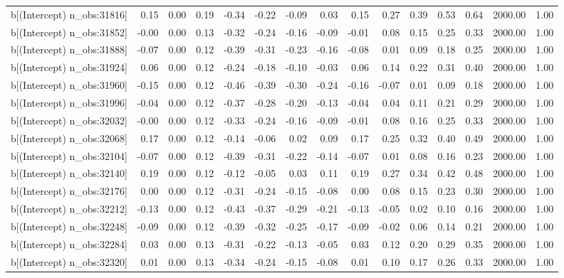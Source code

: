 \begin{table}[ht]
\begin{tabular}{rrrrrrrrrrrrrrr}
  b[(Intercept) n\_obs:31816] & 0.15 & 0.00 & 0.19 & -0.34 & -0.22 & -0.09 & 0.03 & 0.15 & 0.27 & 0.39 & 0.53 & 0.64 & 2000.00 & 1.00 \\ 
  b[(Intercept) n\_obs:31852] & -0.00 & 0.00 & 0.13 & -0.32 & -0.24 & -0.16 & -0.09 & -0.01 & 0.08 & 0.15 & 0.25 & 0.33 & 2000.00 & 1.00 \\ 
  b[(Intercept) n\_obs:31888] & -0.07 & 0.00 & 0.12 & -0.39 & -0.31 & -0.23 & -0.16 & -0.08 & 0.01 & 0.09 & 0.18 & 0.25 & 2000.00 & 1.00 \\ 
  b[(Intercept) n\_obs:31924] & 0.06 & 0.00 & 0.12 & -0.24 & -0.18 & -0.10 & -0.03 & 0.06 & 0.14 & 0.22 & 0.31 & 0.40 & 2000.00 & 1.00 \\ 
  b[(Intercept) n\_obs:31960] & -0.15 & 0.00 & 0.12 & -0.46 & -0.39 & -0.30 & -0.24 & -0.16 & -0.07 & 0.01 & 0.09 & 0.18 & 2000.00 & 1.00 \\ 
  b[(Intercept) n\_obs:31996] & -0.04 & 0.00 & 0.12 & -0.37 & -0.28 & -0.20 & -0.13 & -0.04 & 0.04 & 0.11 & 0.21 & 0.29 & 2000.00 & 1.00 \\ 
  b[(Intercept) n\_obs:32032] & -0.00 & 0.00 & 0.12 & -0.33 & -0.24 & -0.16 & -0.09 & -0.01 & 0.08 & 0.16 & 0.25 & 0.33 & 2000.00 & 1.00 \\ 
  b[(Intercept) n\_obs:32068] & 0.17 & 0.00 & 0.12 & -0.14 & -0.06 & 0.02 & 0.09 & 0.17 & 0.25 & 0.32 & 0.40 & 0.49 & 2000.00 & 1.00 \\ 
  b[(Intercept) n\_obs:32104] & -0.07 & 0.00 & 0.12 & -0.39 & -0.31 & -0.22 & -0.14 & -0.07 & 0.01 & 0.08 & 0.16 & 0.23 & 2000.00 & 1.00 \\ 
  b[(Intercept) n\_obs:32140] & 0.19 & 0.00 & 0.12 & -0.12 & -0.05 & 0.03 & 0.11 & 0.19 & 0.27 & 0.34 & 0.42 & 0.48 & 2000.00 & 1.00 \\ 
  b[(Intercept) n\_obs:32176] & 0.00 & 0.00 & 0.12 & -0.31 & -0.24 & -0.15 & -0.08 & 0.00 & 0.08 & 0.15 & 0.23 & 0.30 & 2000.00 & 1.00 \\ 
  b[(Intercept) n\_obs:32212] & -0.13 & 0.00 & 0.12 & -0.43 & -0.37 & -0.29 & -0.21 & -0.13 & -0.05 & 0.02 & 0.10 & 0.16 & 2000.00 & 1.00 \\ 
  b[(Intercept) n\_obs:32248] & -0.09 & 0.00 & 0.12 & -0.39 & -0.32 & -0.25 & -0.17 & -0.09 & -0.02 & 0.06 & 0.14 & 0.21 & 2000.00 & 1.00 \\ 
  b[(Intercept) n\_obs:32284] & 0.03 & 0.00 & 0.13 & -0.31 & -0.22 & -0.13 & -0.05 & 0.03 & 0.12 & 0.20 & 0.29 & 0.35 & 2000.00 & 1.00 \\ 
  b[(Intercept) n\_obs:32320] & 0.01 & 0.00 & 0.13 & -0.34 & -0.24 & -0.15 & -0.08 & 0.01 & 0.10 & 0.17 & 0.26 & 0.33 & 2000.00 & 1.00 \\ 

\end{tabular}
\end{table}
